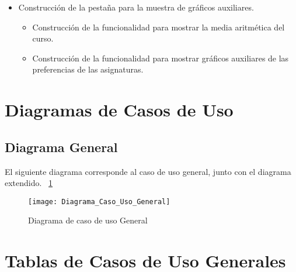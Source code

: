 \begin{itemize}
\item Construcción de la pestaña para la muestra de gráficos auxiliares. 
\begin{itemize}
\item Construcción de la funcionalidad para mostrar la media aritmética del curso. 
\item Construcción de la funcionalidad para mostrar gráficos auxiliares de las preferencias de las asignaturas. 
\end{itemize}

\end{itemize}

\section{Diagramas de Casos de Uso}
\subsection{Diagrama General}
El siguiente diagrama corresponde al  caso de uso general, junto con el diagrama extendido. ~\ref{fig:Diagrama_Caso_Uso_General}
\begin{figure}[h]
\centering
\texttt{[image: Diagrama\_Caso\_Uso\_General]}
\caption{Diagrama de caso de uso General}
\label{fig:Diagrama_Caso_Uso_General}
\end{figure}

\section{Tablas de Casos de Uso Generales}
